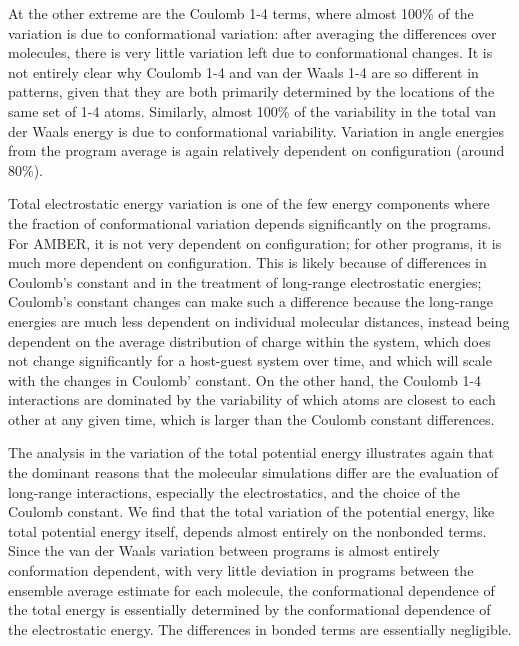 At the other extreme are the Coulomb 1-4 terms, where almost 100\% of
the variation is due to conformational variation: after averaging the
differences over molecules, there is very little variation left due to
conformational changes. It is not entirely clear why Coulomb 1-4 and
van der Waals 1-4 are so different in patterns, given that they are
both primarily determined by the locations of the same set of 1-4 atoms.
Similarly, almost 100\% of the variability in the total van der Waals
energy is due to conformational variability.  Variation in angle
energies from the program average is again relatively dependent on
configuration (around 80\%). 

Total electrostatic energy variation is one of the few energy components
where the fraction of conformational variation depends significantly
on the programs.  For AMBER, it is not very dependent on
configuration; for other programs, it is much more dependent on
configuration. This is likely because of differences in Coulomb's
constant and in the treatment of long-range electrostatic energies;
Coulomb's constant changes can make such a difference because the
long-range energies are much less dependent on individual molecular
distances, instead being dependent on the average distribution of
charge within the system, which does not change significantly for a
host-guest system over time, and which will scale with the changes in
Coulomb' constant.  On the other hand, the Coulomb 1-4 interactions
are dominated by the variability of which atoms are closest to each
other at any given time, which is larger than the Coulomb constant
differences.

The analysis in the variation of the total potential energy
illustrates again that the dominant reasons that the molecular
simulations differ are the evaluation of long-range interactions,
especially the electrostatics, and the choice of the Coulomb
constant. We find that the total variation of the potential energy,
like total potential energy itself, depends almost entirely on the
nonbonded terms.  Since the van der Waals variation between programs
is almost entirely conformation dependent, with very little deviation
in programs between the ensemble average estimate for each molecule,
the conformational dependence of the total energy is essentially
determined by the conformational dependence of the electrostatic
energy. The differences in bonded terms are essentially negligible.


